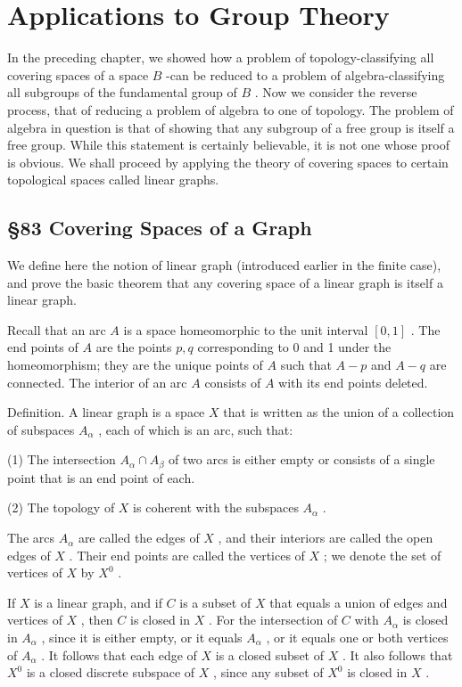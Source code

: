 \chapter{Applications to Group Theory}

In the preceding chapter, we showed how a problem of topology-classifying all covering spaces of a space \(B\) -can be reduced to a problem of algebra-classifying all subgroups of the fundamental group of \(B\) . Now we consider the reverse process, that of reducing a problem of algebra to one of topology. The problem of algebra in question is that of showing that any subgroup of a free group is itself a free group. While this statement is certainly believable, it is not one whose proof is obvious. We shall proceed by applying the theory of covering spaces to certain topological spaces called linear graphs.

\section*{ \S 83 Covering Spaces of a Graph}

We define here the notion of linear graph (introduced earlier in the finite case), and prove the basic theorem that any covering space of a linear graph is itself a linear graph.

Recall that an arc \(A\) is a space homeomorphic to the unit interval \(\left\lbrack  {0,1}\right\rbrack\) . The end points of \(A\) are the points \(p,q\) corresponding to 0 and 1 under the homeomorphism; they are the unique points of \(A\) such that \(A - p\) and \(A - q\) are connected. The interior of an arc \(A\) consists of \(A\) with its end points deleted.

Definition. A linear graph is a space \(X\) that is written as the union of a collection of subspaces \({A}_{\alpha }\) , each of which is an arc, such that:

(1) The intersection \({A}_{\alpha } \cap  {A}_{\beta }\) of two arcs is either empty or consists of a single point that is an end point of each.

(2) The topology of \(X\) is coherent with the subspaces \({A}_{\alpha }\) .

The arcs \({A}_{\alpha }\) are called the edges of \(X\) , and their interiors are called the open edges of \(X\) . Their end points are called the vertices of \(X\) ; we denote the set of vertices of \(X\) by \({X}^{0}\) .

If \(X\) is a linear graph, and if \(C\) is a subset of \(X\) that equals a union of edges and vertices of \(X\) , then \(C\) is closed in \(X\) . For the intersection of \(C\) with \({A}_{\alpha }\) is closed in \({A}_{\alpha }\) , since it is either empty, or it equals \({A}_{\alpha }\) , or it equals one or both vertices of \({A}_{\alpha }\) . It follows that each edge of \(X\) is a closed subset of \(X\) . It also follows that \({X}^{0}\) is a closed discrete subspace of \(X\) , since any subset of \({X}^{0}\) is closed in \(X\) .

